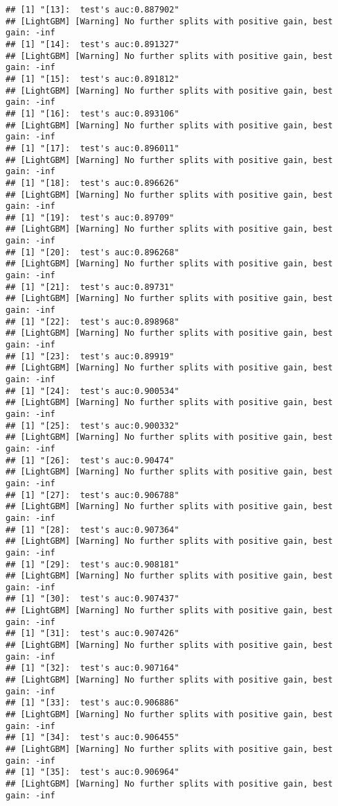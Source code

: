 \documentclass[
]{article}
\begin{document}
\begin{verbatim}
## [1] "[13]:  test's auc:0.887902"
## [LightGBM] [Warning] No further splits with positive gain, best gain: -inf
## [1] "[14]:  test's auc:0.891327"
## [LightGBM] [Warning] No further splits with positive gain, best gain: -inf
## [1] "[15]:  test's auc:0.891812"
## [LightGBM] [Warning] No further splits with positive gain, best gain: -inf
## [1] "[16]:  test's auc:0.893106"
## [LightGBM] [Warning] No further splits with positive gain, best gain: -inf
## [1] "[17]:  test's auc:0.896011"
## [LightGBM] [Warning] No further splits with positive gain, best gain: -inf
## [1] "[18]:  test's auc:0.896626"
## [LightGBM] [Warning] No further splits with positive gain, best gain: -inf
## [1] "[19]:  test's auc:0.89709"
## [LightGBM] [Warning] No further splits with positive gain, best gain: -inf
## [1] "[20]:  test's auc:0.896268"
## [LightGBM] [Warning] No further splits with positive gain, best gain: -inf
## [1] "[21]:  test's auc:0.89731"
## [LightGBM] [Warning] No further splits with positive gain, best gain: -inf
## [1] "[22]:  test's auc:0.898968"
## [LightGBM] [Warning] No further splits with positive gain, best gain: -inf
## [1] "[23]:  test's auc:0.89919"
## [LightGBM] [Warning] No further splits with positive gain, best gain: -inf
## [1] "[24]:  test's auc:0.900534"
## [LightGBM] [Warning] No further splits with positive gain, best gain: -inf
## [1] "[25]:  test's auc:0.900332"
## [LightGBM] [Warning] No further splits with positive gain, best gain: -inf
## [1] "[26]:  test's auc:0.90474"
## [LightGBM] [Warning] No further splits with positive gain, best gain: -inf
## [1] "[27]:  test's auc:0.906788"
## [LightGBM] [Warning] No further splits with positive gain, best gain: -inf
## [1] "[28]:  test's auc:0.907364"
## [LightGBM] [Warning] No further splits with positive gain, best gain: -inf
## [1] "[29]:  test's auc:0.908181"
## [LightGBM] [Warning] No further splits with positive gain, best gain: -inf
## [1] "[30]:  test's auc:0.907437"
## [LightGBM] [Warning] No further splits with positive gain, best gain: -inf
## [1] "[31]:  test's auc:0.907426"
## [LightGBM] [Warning] No further splits with positive gain, best gain: -inf
## [1] "[32]:  test's auc:0.907164"
## [LightGBM] [Warning] No further splits with positive gain, best gain: -inf
## [1] "[33]:  test's auc:0.906886"
## [LightGBM] [Warning] No further splits with positive gain, best gain: -inf
## [1] "[34]:  test's auc:0.906455"
## [LightGBM] [Warning] No further splits with positive gain, best gain: -inf
## [1] "[35]:  test's auc:0.906964"
## [LightGBM] [Warning] No further splits with positive gain, best gain: -inf

\end{verbatim}
\end{document}
